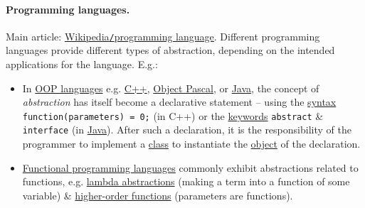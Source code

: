 \documentclass{article}
\begin{document}
\paragraph{Programming languages.} Main article: \href{https://en.wikipedia.org/wiki/Programming_language}{Wikipedia{\tt/}programming language}. Different programming languages provide different types of abstraction, depending on the intended applications for the language. E.g.:
\begin{itemize}
	\item In \href{https://en.wikipedia.org/wiki/Object-oriented_programming_language}{OOP languages} e.g. \href{https://en.wikipedia.org/wiki/C%2B%2B}{C++}, \href{https://en.wikipedia.org/wiki/Object_Pascal}{Object Pascal}, or \href{https://en.wikipedia.org/wiki/Java_(programming_language)}{Java}, the concept of {\it abstraction} has itself become a declarative statement -- using the \href{https://en.wikipedia.org/wiki/Syntax_(programming_languages)}{syntax} \verb|function(parameters) = 0;| (in C++) or the \href{https://en.wikipedia.org/wiki/Keyword_(computer_programming)}{keywords} {\tt abstract} \& {\tt interface} (in \href{https://en.wikipedia.org/wiki/Java_(programming_language)}{Java}). After such a declaration, it is the responsibility of the programmer to implement a \href{https://en.wikipedia.org/wiki/Class_(computer_science)}{class} to instantiate the \href{https://en.wikipedia.org/wiki/Object_(computer_science)}{object} of the declaration.
	\item \href{https://en.wikipedia.org/wiki/Functional_programming_language}{Functional programming languages} commonly exhibit abstractions related to functions, e.g. \href{https://en.wikipedia.org/wiki/Lambda_abstraction}{lambda abstractions} (making a term into a function of some variable) \& \href{https://en.wikipedia.org/wiki/Higher-order_function}{higher-order functions} (parameters are functions).

\end{itemize}
\end{document}
